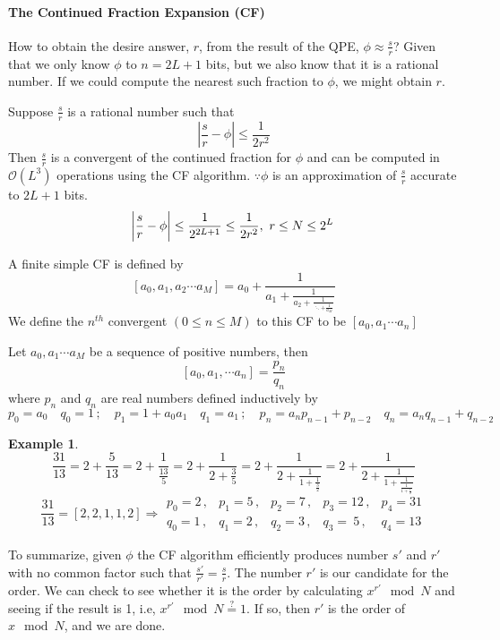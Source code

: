 \documentclass[]{book}
\newtheorem*{example}{Example}
\theoremstyle{nonumberplain}
\begin{document}
\paragraph{The Continued Fraction Expansion (CF)}

How to obtain the desire answer, $r$, from the result of the QPE, $\phi\approx \frac{s}{r}$? Given that we only know $\phi$ to $n=2L+1$ bits, but we also know that it is a rational number. If we could compute the nearest such fraction to $\phi$, we might obtain $r$.
\begin{theorem}
Suppose $\frac{s}{r}$ is a rational number such that
\[
|\frac{s}{r}-\phi| \leq \frac{1}{2r^{2}}
\] 
Then $\frac{s}{r}$ is a convergent of the continued fraction for $\phi$ and can be computed in $\mathcal{O}(L^{3})$ operations using the CF algorithm.
$\because \phi$ is an approximation of $\frac{s}{r}$ accurate to $2L+1$ bits.
$$\abs{\frac{s}{r}-\phi} \leq \frac{1}{2^{2L+1}} \leq \frac{1}{2r^{2}}, \ r \leq N \leq 2^{L} $$
\end{theorem}
\begin{definition}
	A finite simple CF is defined by
\[
	[a_0,a_{1},a_{2}\cdots a_{M}] = a_{0} + \frac{1}{a_{1}+\frac{1}{a_{2}+\frac{1}{\ddots+\frac{1}{a_{M}}}}}
\] 
We define the $n^{th}$ convergent $(0\leq n\leq M)$ to this CF to be  $[a_{0},a_{1}\cdots a_{n}]$
\end{definition}
\begin{theorem}
Let $a_{0},a_{1}\cdots a_{M}$ be a sequence of positive numbers, then 
\[
	[a_0,a_{1},\cdots a_{n}]=\frac{p_{n}}{q_{n}}
\] 
where $p_{n}$ and $q_{n}$ are real numbers defined inductively by
\[
p_{0} = a_{0}\quad q_{0} = 1\,;\quad p_{1}=1+a_{0}a_{1}\quad q_{1}=a_{1}\,;\quad  p_{n} = a_{n}p_{n-1}+p_{n-2}\quad q_{n} = a_{n}q_{n-1}+q_{n-2}
\] 
\end{theorem}

\begin{example}
\[
\frac{31}{13} = 2+\frac{5}{13} = 2 + \frac{1}{\frac{13}{5}} = 2 + \frac{1}{2 +\frac{3}{5}} = 2 + \frac{1}{2 +\frac{1}{1+\frac{1}{\frac{3}{2}}}} = 2 + \frac{1}{2 +\frac{1}{1+\frac{1}{\frac{1}{1+\frac{1}{2}}}}}
\]
\[
\frac{31}{13} = [2,2,1,1,2] \Rightarrow 
\begin{matrix}
    p_0 = 2\,, & p_1 = 5\,, & p_2 = 7\,, & p_3 = 12\,, & p_4 = 31\\ 
    q_0 = 1\,, & q_1 = 2\,, & q_2 = 3\,, & q_3 =\ 5\,, & q_4 = 13
\end{matrix}
\]
\end{example}
To summarize, given $\phi$ the CF algorithm efficiently produces number $s'$ and $r'$ with no common factor such that $\frac{s'}{r'}=\frac{s}{r}$. The number $r'$ is our candidate for the order. We can check to see whether it is the order by calculating $x^{r'}\mod{N}$ and seeing if the result is 1, i.e, $x^{r'} \mod{N} \stackrel{?}{=} 1$. If so, then $r'$ is the order of $x\mod{N}$, and we are done.
\end{document}
